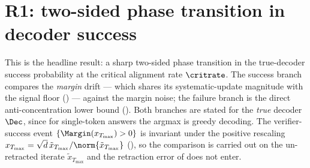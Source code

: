 \section{R1: two-sided phase transition in decoder success}
\label{sec:R1}

This is the headline result: a sharp two-sided phase transition in the
true-decoder success probability at the critical alignment rate
$\critrate$. The success branch compares the \emph{margin} drift --- which
shares its systematic-update magnitude with the signal floor
() --- against the margin noise; the failure branch
is the direct anti-concentration lower bound
(). Both branches are stated for the
\emph{true} decoder $\Dec$, since for single-token answers the argmax is
greedy decoding. The verifier-success event $\{\Margin(x_{T_{\max}})>0\}$ is
invariant under the positive rescaling $x_{T_{\max}}=\sqrt d\,\tilde x_{T_{\max}}/\norm{\tilde x_{T_{\max}}}$
(), so the comparison is carried out on
the un-retracted iterate $\tilde x_{T_{\max}}$ and the retraction error of
 does not enter.

